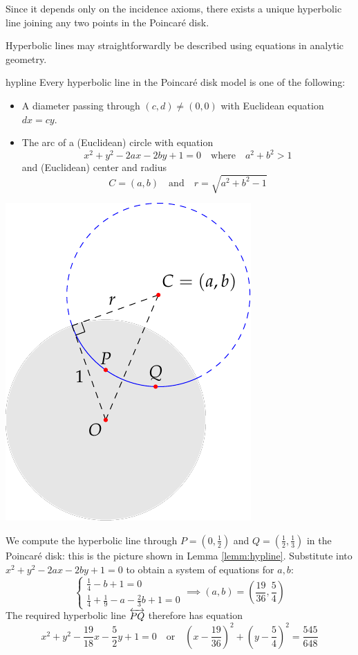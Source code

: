 Since it depends only on the incidence axioms, there exists a unique hyperbolic line joining any two points in the Poincaré disk.\par

Hyperbolic lines may straightforwardly be described using equations in analytic geometry.

\begin{lemm}[lower separated=false, sidebyside, sidebyside align=top seam, sidebyside gap=0pt, righthand width=0.35\linewidth]{}{hypline}
Every hyperbolic line in the Poincaré disk model is one of the following:
\begin{itemize}
  \item A diameter passing through $(c,d)\neq (0,0)$ with Euclidean equation $dx=cy$.
  \item The arc of a (Euclidean) circle with equation
	\[x^2+y^2-2ax-2by+1=0\quad\text{where}\quad a^2+b^2>1\]
	and (Euclidean) center and radius
	\[C=(a,b)\quad\text{and}\quad r=\sqrt{a^2+b^2-1}\]
\end{itemize}
\tcblower
\flushright\includegraphics[scale=0.9]{models-example}
\end{lemm}\goodbreak

\begin{example}{}{}
We compute the hyperbolic line through $P=(0,\frac 12)$ and $Q=(\frac 12,\frac 13)$ in the Poincaré disk: this is the picture shown in Lemma \ref{lemm:hypline}.\smallbreak
Substitute into $x^2+y^2-2ax-2by+1=0$ to obtain a system of equations for $a,b$:
\[\begin{cases}
\frac 14-b+1=0\\
\frac 14+\frac 19-a-\frac 23b+1=0
\end{cases}\implies (a,b)=\left(\frac{19}{36},\frac 54\right)\]
The required hyperbolic line $\overleftrightarrow{PQ}$ therefore has equation
\[x^2+y^2-\frac{19}{18}x-\frac{5}{2}y+1=0\quad\text{or}\quad \left(x-\frac{19}{36}\right)^2+\left(y-\frac 54\right)^2=\frac{545}{648}\]
\end{example}

